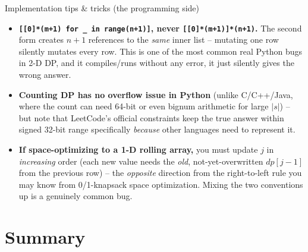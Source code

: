 \documentclass[11pt,aspectratio=169]{beamer}
\begin{document}
\begin{frame}{Implementation tips \& tricks (the programming side)}
  \small
  \begin{itemize}
    \item \textbf{\texttt{[[0]*(m+1) for \_ in range(n+1)]}, never
    \texttt{[[0]*(m+1)]*(n+1)}.} The second form creates $n{+}1$ references to the
    \emph{same} inner list -- mutating one row silently mutates every row. This is one
    of the most common real Python bugs in 2-D DP, and it compiles/runs without any
    error, it just silently gives the wrong answer.
    \item \textbf{Counting DP has no overflow issue in Python} (unlike C/C++/Java, where
    the count can need 64-bit or even bignum arithmetic for large $|s|$) -- but note
    that LeetCode's official constraints keep the true answer within signed 32-bit
    range specifically \emph{because} other languages need to represent it.
    \item \textbf{If space-optimizing to a 1-D rolling array,} you must update $j$ in
    \emph{increasing} order (each new value needs the \emph{old}, not-yet-overwritten
    $dp[j-1]$ from the previous row) -- the \emph{opposite} direction from the
    right-to-left rule you may know from 0/1-knapsack space optimization. Mixing the two
    conventions up is a genuinely common bug.
  \end{itemize}
\end{frame}

\section{Summary}
\end{document}
